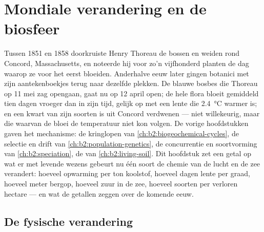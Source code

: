 \chapter{Mondiale verandering en de biosfeer}\label{ch:b2:global-change}

Tussen 1851 en 1858 doorkruiste Henry Thoreau de bossen en weiden rond
Concord, Massachusetts, en noteerde hij voor zo'n vijfhonderd planten de dag
waarop ze voor het eerst bloeiden. Anderhalve eeuw later gingen botanici met
zijn aantekenboekjes terug naar dezelfde plekken. De blauwe bosbes die Thoreau
op 11 mei zag opengaan, gaat nu op 12 april open; de hele flora bloeit
gemiddeld tien dagen vroeger dan in zijn tijd, gelijk op met een lente die
\qty{2.4}{\celsius} warmer is; en een kwart van zijn soorten is uit Concord
verdwenen --- niet willekeurig, maar die waarvan de bloei de temperatuur niet
kon volgen. De vorige hoofdstukken gaven het mechanisme: de kringlopen
van \cref{ch:b2:biogeochemical-cycles}, de selectie en drift van
\cref{ch:b2:population-genetics}, de concurrentie en soortvorming
van \cref{ch:b2:speciation}, de  van \cref{ch:b2:living-soil}.
Dit hoofdstuk zet een getal op wat er met levende wezens gebeurt nu één soort
de chemie van de lucht en de zee verandert: hoeveel opwarming per ton koolstof,
hoeveel dagen lente per graad, hoeveel meter bergop, hoeveel zuur in de zee,
hoeveel soorten per verloren hectare --- en wat de getallen zeggen over de
komende eeuw.

\section{De fysische verandering}

